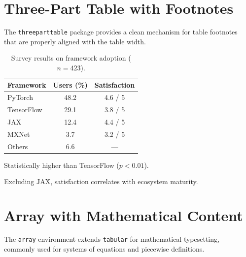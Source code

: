 \documentclass[
    language=english,
    doctype=article,
    institution=none,
]{../../omnilatex}
\begin{document}
\section{Three-Part Table with Footnotes}
\label{sec:threeparttable}

The \texttt{threeparttable} package provides a clean mechanism for table footnotes
that are properly aligned with the table width.

\begin{table}[htbp]
    \centering
    \caption{Survey results on framework adoption ($n = 423$).}
    \label{tab:threeparttable}
    \begin{threeparttable}
        \begin{tabular}{lcc}
            \toprule
            \textbf{Framework} & \textbf{Users (\%)} & \textbf{Satisfaction} \\
            \midrule
            PyTorch       & 48.2 & 4.6 / 5\tnote{a} \\
            TensorFlow    & 29.1 & 3.8 / 5 \\
            JAX           & 12.4 & 4.4 / 5\tnote{b} \\
            MXNet          & 3.7 & 3.2 / 5 \\
            Others         & 6.6 & --- \\
            \bottomrule
        \end{tabular}
        \begin{tablenotes}
            \footnotesize
            \item[a] Statistically higher than TensorFlow ($p < 0.01$).
            \item[b] Excluding JAX, satisfaction correlates with ecosystem maturity.
        \end{tablenotes}
    \end{threeparttable}
\end{table}

\section{Array with Mathematical Content}
\label{sec:array-math}

The \texttt{array} environment extends \texttt{tabular} for mathematical typesetting,
commonly used for systems of equations and piecewise definitions.
\end{document}
